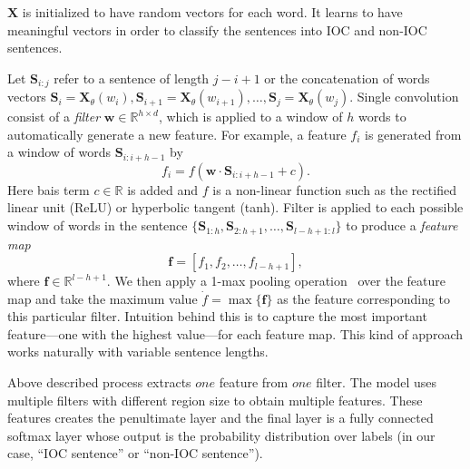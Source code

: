 $\mathbf{X}$ is initialized to have random vectors for each word. It learns to have meaningful vectors in order to classify the sentences into IOC and non-IOC sentences.

Let $\mathbf{S}_{i:j}$ refer to a sentence of length $j-i+1$ or the concatenation of words vectors $\mathbf{S}_i = \mathbf{X}_\theta(w_i), \mathbf{S}_{i+1} = \mathbf{X}_\theta(w_{i+1}), \ldots, \mathbf{S}_{j}=\mathbf{X}_\theta(w_j)$.
Single convolution consist of a \emph{filter} $\mathbf{w} \in \mathbb{R}^{h\times d}$, which is applied to a window of $h$ words to automatically generate a new feature. For example, a feature $f_i$ is generated from a window of words $\mathbf{S}_{i:i+h-1}$ by
\begin{equation}
f_i = f(\mathbf{w} \cdot \mathbf{S}_{i:i+h-1} + c).
\end{equation}
Here bais term $c \in \mathbb{R}$ is added and $f$ is a non-linear function such as the rectified linear unit (ReLU) or hyperbolic tangent (tanh). Filter is applied to each possible window of words in the sentence $\{\mathbf{S}_{1:h}, \mathbf{S}_{2:h+1}, \ldots, \mathbf{S}_{l-h+1:l}\}$ to produce a \emph{feature map}
\begin{equation}
\mathbf{f} = [f_1, f_2, \ldots, f_{l-h+1}],
\end{equation}
where $\mathbf{f} \in \mathbb{R}^{l-h+1}$. We then apply a 1-max pooling operation~\cite{ranzato} over the feature map and take the maximum value $\dot{f} = \max \{\mathbf{f}\}$ as the feature corresponding to this particular filter. Intuition behind this is to capture the most important feature---one with the highest value---for each feature map. This kind of approach works naturally with variable sentence lengths. 

Above described process extracts $one$ feature from $one$ filter. The model uses multiple filters with different region size to obtain multiple features. These features creates the penultimate layer and the final layer is a fully connected softmax layer whose output is the probability distribution over labels (in our case, “IOC sentence” or “non-IOC sentence”).

